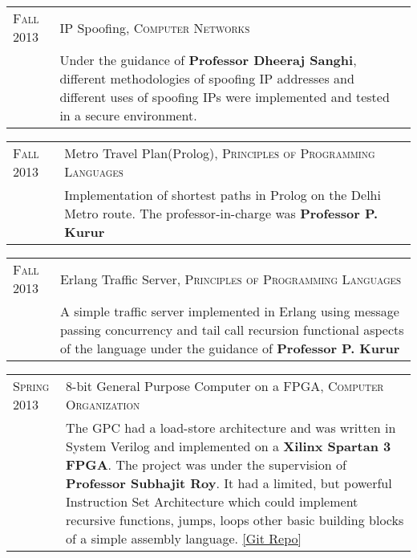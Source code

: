 \documentclass[a4paper,10pt]{article} %
\begin{document}
\begin{tabular}{>{\raggedleft}p{2.2cm}|p{15cm}}
    \textsc{Fall 2013} & IP Spoofing, \textsc{Computer Networks} \\
                       & \footnotesize{Under the guidance of \textbf{Professor Dheeraj Sanghi}, different methodologies
                          of spoofing IP addresses and different uses of spoofing IPs were implemented and tested
                          in a secure environment.}\\
\end{tabular}

\begin{tabular}{>{\raggedleft}p{2.2cm}|p{15cm}}
    \textsc{Fall 2013} & Metro Travel Plan(Prolog), \textsc{Principles of Programming Languages} \\
                       & \footnotesize{Implementation of shortest paths in Prolog on the Delhi Metro route.
                          The professor-in-charge was \textbf{Professor P. Kurur}}\\
\end{tabular}

\begin{tabular}{>{\raggedleft}p{2.2cm}|p{15cm}}
    \textsc{Fall 2013} & Erlang Traffic Server, \textsc{Principles of Programming Languages} \\
                       & \footnotesize{A simple traffic server implemented in Erlang using message passing
                          concurrency and tail call recursion functional aspects of the language under the
                          guidance of \textbf{Professor P. Kurur}}\\
\end{tabular}

\begin{tabular}{>{\raggedleft}p{2.2cm}|p{15cm}}
    \textsc{Spring 2013} & 8-bit General Purpose Computer on a FPGA, \textsc{Computer Organization} \\
                         & \footnotesize{The GPC had a load-store architecture and was written in System Verilog and
                            implemented on a \textbf{Xilinx Spartan 3 FPGA}.  The project was under the
                            supervision of \textbf{Professor Subhajit Roy}.  It had a limited, but powerful
                            Instruction Set Architecture which could implement recursive functions, jumps,
                            loops  other basic building blocks of a simple assembly language.
                            \href{https://github.com/srijanshetty/220_y11} {[Git Repo]}} \\
\end{tabular}
\end{document}
